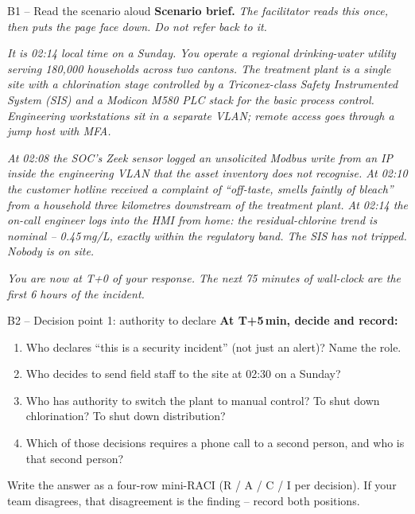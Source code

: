 \documentclass[11pt,a4paper]{article}
\begin{document}
\begin{stepbox}{B1 -- Read the scenario aloud}
\textbf{Scenario brief.} \emph{The facilitator reads this once, then puts the page face down. Do not refer back to it.}

\vspace{1mm}
\emph{It is 02:14 local time on a Sunday. You operate a regional drinking-water utility serving 180{,}000 households across two cantons. The treatment plant is a single site with a chlorination stage controlled by a Triconex-class Safety Instrumented System (SIS) and a Modicon M580 PLC stack for the basic process control. Engineering workstations sit in a separate VLAN; remote access goes through a jump host with MFA.}

\vspace{1mm}
\emph{At 02:08 the SOC's Zeek sensor logged an unsolicited Modbus write from an IP inside the engineering VLAN that the asset inventory does not recognise. At 02:10 the customer hotline received a complaint of ``off-taste, smells faintly of bleach'' from a household three kilometres downstream of the treatment plant. At 02:14 the on-call engineer logs into the HMI from home: the residual-chlorine trend is nominal -- 0.45\,mg/L, exactly within the regulatory band. The SIS has not tripped. Nobody is on site.}

\vspace{1mm}
\emph{You are now at T+0 of your response. The next 75 minutes of wall-clock are the first 6 hours of the incident.}
\end{stepbox}

\begin{stepbox}{B2 -- Decision point 1: authority to declare}
\textbf{At T+5\,min, decide and record:}
\begin{enumerate}\setlength{\itemsep}{1pt}
  \item Who declares ``this is a security incident'' (not just an alert)? Name the role.
  \item Who decides to send field staff to the site at 02:30 on a Sunday?
  \item Who has authority to switch the plant to manual control? To shut down chlorination? To shut down distribution?
  \item Which of those decisions requires a phone call to a second person, and who is that second person?
\end{enumerate}
Write the answer as a four-row mini-RACI (R / A / C / I per decision). If your team disagrees, that disagreement is the finding -- record both positions.
\end{stepbox}
\end{document}
